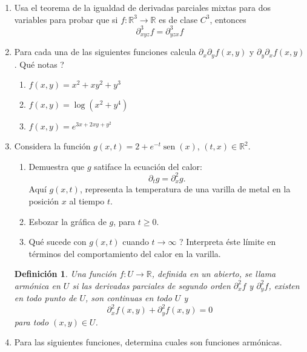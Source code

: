 \documentclass{article}
\newtheorem{definicion}{Definici\'on}
\theoremstyle{definition}
\newcommand{\sen}{\operatorname{sen}}
\begin{document}
\begin{enumerate}
      \item Usa el teorema de la igualdad de derivadas parciales mixtas
    para dos variables para probar que si $f:\mathbb{R}^3\to \mathbb{R}$
    es de clase $C^3$, entonces
    $$
    \partial^{3}_{xyz}f=\partial_{yzx}^3 f
    $$


    
    \item Para cada una de las siguientes funciones
    calcula $\partial_{x}\partial_yf(x,y)$ y $\partial_y\partial_xf(x,y)$.
    \textquestiondown Qu\'e notas ?
    \begin{enumerate}
    \item $f(x,y)=x^2+xy^2+y^3$
    \item $f(x,y)=\log(x^2+y^4)$
    \item $f(x,y)=e^{3x+2xy+y^2}$                 
    \end{enumerate}

    
  \item Considera  la funci\'on $g(x,t)=2+e^{-t}\sen(x)$,
    $(t,x)\in \mathbb{R}^2$.

    \begin{enumerate}
    \item Demuestra que $g$ satiface la
      ecuaci\'on del calor:
      $$
      \partial_t g= \partial_x^2g.
      $$
      Aqu\'i $g(x,t)$, representa la temperatura de una varilla de metal
      en la posici\'on $x$ al tiempo $t$.
    \item Esbozar la gr\'afica de $g$, para $t\geq 0$.
    \item \textquestiondown Qu\'e sucede con $g(x,t)$ cuando $t\to \infty$ ?
    Interpreta \'este l\'imite en t\'erminos del comportamiento del calor
    en la varilla.

  \end{enumerate}
  

    \begin{definicion}
      Una funci\'on $f:U\to \mathbb{R}$, definida en un abierto,
      se llama arm\'onica en $U$ si las
      derivadas parciales de segundo orden $\partial_x^2 f$ y $\partial_y^2 f$,
      existen en todo punto de $U$, son continuas en todo $U$ y
       $$
       \partial_x^2f(x,y)+\partial_y^2f(x,y)=0
       $$ 
       para todo $(x,y)\in U$. 
     \end{definicion}

  \item  Para las siguientes funciones,
    determina cuales son funciones arm\'onicas. 


\end{enumerate}
\end{document}
